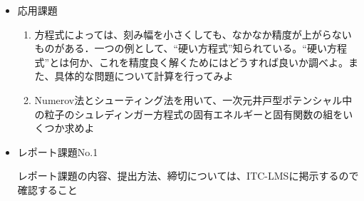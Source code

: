 \documentclass[11pt]{jarticle}
\begin{document}
\begin{itemize}
\item 応用課題
  \begin{enumerate}
  \item 方程式によっては、刻み幅を小さくしても、なかなか精度が上がらないものがある．一つの例として、``硬い方程式''知られている。``硬い方程式''とは何か、これを精度良く解くためにはどうすれば良いか調べよ。また、具体的な問題について計算を行ってみよ
  \item Numerov法とシューティング法を用いて、一次元井戸型ポテンシャル中の粒子のシュレディンガー方程式の固有エネルギーと固有関数の組をいくつか求めよ
  \end{enumerate}

\item レポート課題No.1

  レポート課題の内容、提出方法、締切については、ITC-LMSに掲示するので確認すること

\end{itemize}
\end{document}
